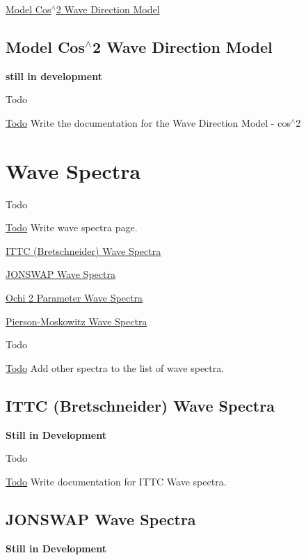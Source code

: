 \hyperlink{cos_square_model}{Model Cos$^\wedge$2 Wave Direction Model} \hypertarget{cos_square_model}{}\subsection{Model Cos$^\wedge$2 Wave Direction Model}\label{cos_square_model}
{\bfseries still in development}

\begin{DoxyRefDesc}{Todo}
\item[\hyperlink{todo__todo000030}{Todo}]Write the documentation for the Wave Direction Model -\/ cos$^\wedge$2\end{DoxyRefDesc}
\hypertarget{wave_spectra}{}\section{Wave Spectra}\label{wave_spectra}
\begin{DoxyRefDesc}{Todo}
\item[\hyperlink{todo__todo000036}{Todo}]Write wave spectra page.\end{DoxyRefDesc}


\hyperlink{ittc_spectra}{I\-T\-T\-C (Bretschneider) Wave Spectra}

\hyperlink{jonswap_spectra}{J\-O\-N\-S\-W\-A\-P Wave Spectra}

\hyperlink{ochi-2param_spectra}{Ochi 2 Parameter Wave Spectra}

\hyperlink{p-m_spectra}{Pierson-\/\-Moskowitz Wave Spectra}

\begin{DoxyRefDesc}{Todo}
\item[\hyperlink{todo__todo000037}{Todo}]Add other spectra to the list of wave spectra.\end{DoxyRefDesc}
\hypertarget{ittc_spectra}{}\subsection{I\-T\-T\-C (Bretschneider) Wave Spectra}\label{ittc_spectra}
{\bfseries Still in Development}

\begin{DoxyRefDesc}{Todo}
\item[\hyperlink{todo__todo000032}{Todo}]Write documentation for I\-T\-T\-C Wave spectra.\end{DoxyRefDesc}
\hypertarget{jonswap_spectra}{}\subsection{J\-O\-N\-S\-W\-A\-P Wave Spectra}\label{jonswap_spectra}
{\bfseries Still in Development}

